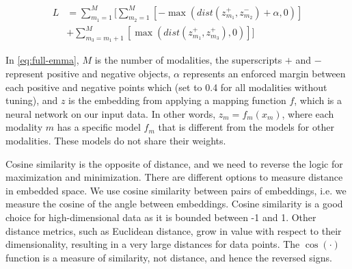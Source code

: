 \documentclass[sigconf,natbib=true,anonymous=true]{acmart}
\begin{document}

\begin{equation}\label{eq:full-emma}
\begin{split}
    L &= \sum_{m_1=1}^{M} \Biggl[ \sum_{m_2=1}^{M} \left[ -\max (dist(z_{m_1}^{+}, z_{m_2}^{-}) + \alpha,0) \right]  \\
    & + \sum_{m_3=m_1+1}^{M} \left[ \max( dist(z_{m_1}^{+},z_{m_3}^{+}),0) \right] \Biggr]
\end{split}
\end{equation}

In \cref{eq:full-emma}, $M$ is the number of modalities, the superscripts $+$ and $-$ represent positive and negative objects, $\alpha$ represents an enforced margin between each positive and negative points which (set to 0.4 for all modalities without tuning), and $z$ is the embedding from applying a mapping function $f$, which is a neural network on our input data. In other words, $z_m = f_m(x_m)$, where each modality $m$ has a specific model $f_m$ that is different from the models for other modalities. These models do not share their weights. 

Cosine similarity is the opposite of distance, and we need to reverse the logic for maximization and minimization. 
% 
There are different options to measure distance in embedded space. We use cosine similarity between pairs of embeddings, i.e. we measure the cosine of the angle between embeddings. Cosine similarity is a good choice for high-dimensional data as it is bounded between -1 and 1. Other distance metrics, such as Euclidean distance, grow in value with respect to their dimensionality, resulting in a very large distances for data points. The $\cos(\cdot)$ function is a measure of similarity, not distance, and hence the reversed signs. 
\end{document}
